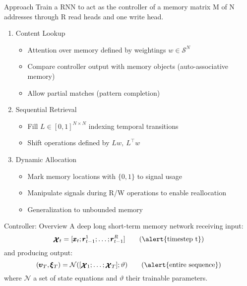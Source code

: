 \documentclass{beamer}
\newcommand{\xx}{\pmb{\raisebox{-1.5pt}{$\mathcal{X}$}}}
\begin{document}
\begin{frame}{Approach}
	Train a RNN to act as the \alert{controller} of a memory matrix M of N 
	addresses through R \alert{read heads} and one \alert{write head}.
	
	\pause
	\begin{enumerate}
	\item \alert{Content Lookup}\\
		\begin{itemize}
		\item \alert{Attention} over memory defined by weightings $w \in \mathcal{S}^N$
		\item Compare controller output with memory objects (\alert{auto-associative memory})
		\item Allow partial matches  (\alert{pattern completion})
		\end{itemize}
	\pause
	\item \alert{Sequential Retrieval}
		\begin{itemize} 
		\item Fill $L \in [0,1]^{N \times N}$ indexing \alert{temporal transitions}
		\item \alert{Shift} operations defined by $Lw,\ L^\top w$
		\end{itemize}
	\pause
	\item \alert{Dynamic Allocation}
		\begin{itemize}
		\item Mark memory locations with $\{0,1\}$ to \alert{signal usage}
		\item Manipulate signals during R/W operations to enable \alert{reallocation}
		\item Generalization to \alert{unbounded memory}
		\end{itemize}
	\end{enumerate}
\end{frame}
	
\begin{frame}{Controller: Overview}
	A deep \alert{long short-term memory network} receiving input:
	\[
	\xx_t=[ \pmb{x}_t; \pmb{r}_{t-1}^1; \dots ;\pmb{r}_{t-1}^R] \tag{\text{\alert{timestep t}}}
	\]
	and producing output:
	\[
	(\pmb{\upsilon}_T,\pmb{\xi}_T)=\mathcal{N}([\xx_1;\dots;\xx_T];\vartheta) \tag{\text{\alert{entire sequence}}}
	\]
	where $\mathcal{N}$ a set of state equations and $\vartheta$ their trainable parameters.
\end{frame}
\end{document}
